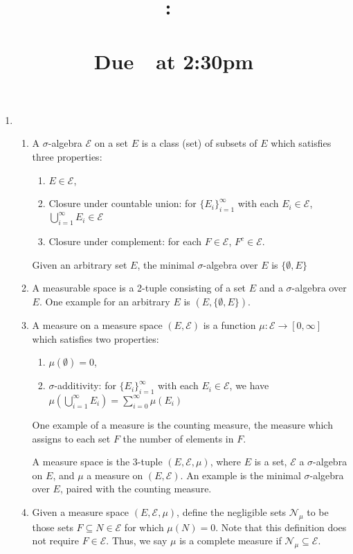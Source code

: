 \documentclass[pstricks, 11pt,a4paper]{article}
\title{
    \vspace{2in}
    \textmd{\textbf{\hmwkClass:\ \hmwkTitle}}\\
    \vspace{0.1in}
    \large{ {\hmwkClassInstructor}}\\
    \normalsize\vspace{0.1in}\large{Due\ \hmwkDueDate\ at 2:30pm}\\
    \vspace{3in}
}
\author{\hmwkAuthorName}
\date{\bf \studentid}
\theoremstyle{theorem}
\begin{document}
\begin{titlepage}
  \maketitle
  \thispagestyle{empty}
\end{titlepage}

\begin{enumerate}
  \item
        \begin{enumerate}
          \item
                A $\sigma$-algebra $\mathcal{E}$ on a set $E$ is a class (set) of subsets of $E$ which satisfies three properties:
                \begin{enumerate}
                  \item \(E \in \mathcal{E}\),
                  \item Closure under countable union: for \(\{E_i\}_{i=1}^{\infty}\) with each \(E_{i} \in \mathcal{E}\), \(\bigcup_{i=1}^{\infty}E_{i} \in \mathcal{E}\)
                  \item Closure under complement: for each \(F \in \mathcal{E}\), \(F^{c} \in \mathcal{E}\).
                \end{enumerate}
                Given an arbitrary set $E$, the minimal $\sigma$-algebra over $E$ is $\{\emptyset, E\}$
          \item A measurable space is a 2-tuple consisting of a set $E$ and a $\sigma$-algebra over $E$. One example for an arbitrary $E$ is $(E, \{\emptyset, E\})$.
          \item A measure on a measure space $(E, \mathcal{E})$ is a function $\mu: \mathcal{E} \rightarrow [0, \infty]$ which satisfies two properties:
                \begin{enumerate}
                  \item $\mu(\emptyset) = 0$,
                  \item $\sigma$-additivity: for \(\{E_i\}_{i=1}^{\infty}\) with each \(E_{i} \in \mathcal{E}\), we have \(\mu\left(\bigcup_{i=1}^{\infty}E_{i}\right) = \sum_{i=0}^{\infty}\mu(E_{i})\)
                \end{enumerate}
                One example of a measure is the counting measure, the measure which assigns to each set $F$ the number of elements in $F$.

                A measure space is the 3-tuple $(E, \mathcal{E}, \mu)$, where $E$ is a set, $\mathcal{E}$ a $\sigma$-algebra on $E$, and $\mu$ a measure on $(E, \mathcal{E})$. An example is the minimal $\sigma$-algebra over $E$, paired with the counting measure.
          \item Given a measure space $(E, \mathcal{E}, \mu)$, define the negligible sets $\mathcal{N}_{\mu}$ to be those sets $F\subseteq N \in \mathcal{E}$ for which $\mu(N) = 0$. Note that this definition does not require $F \in \mathcal{E}$. Thus, we say $\mu$ is a complete measure if $\mathcal{N}_{\mu} \subseteq \mathcal{E}$.


\end{enumerate}
\end{enumerate}
\end{document}
